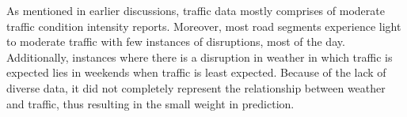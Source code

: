 As mentioned in earlier discussions, traffic data mostly comprises of moderate traffic condition intensity reports. Moreover, most road segments experience light to moderate traffic with few instances of disruptions, most of the day. Additionally, instances where there is a disruption in weather in which traffic is expected lies in weekends when traffic is least expected. Because of the lack of diverse data, it did not completely represent the relationship between weather and traffic, thus resulting in the small weight in prediction. 